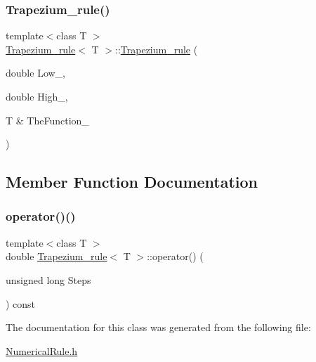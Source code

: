 \subsubsection{\texorpdfstring{Trapezium\+\_\+rule()}{Trapezium\_rule()}}
{\footnotesize\ttfamily template$<$class T $>$ \\
\hyperlink{classTrapezium__rule}{Trapezium\+\_\+rule}$<$ T $>$\+::\hyperlink{classTrapezium__rule}{Trapezium\+\_\+rule} (\begin{DoxyParamCaption}\item[{double}]{Low\+\_\+,  }\item[{double}]{High\+\_\+,  }\item[{T \&}]{The\+Function\+\_\+ }\end{DoxyParamCaption})\hspace{0.3cm}{\ttfamily [inline]}}



\subsection{Member Function Documentation}
\hypertarget{classTrapezium__rule_a6f80a232d2a8fcb21d01b4ac2ec99f12}{}\label{classTrapezium__rule_a6f80a232d2a8fcb21d01b4ac2ec99f12} 
\subsubsection{\texorpdfstring{operator()()}{operator()()}}
{\footnotesize\ttfamily template$<$class T $>$ \\
double \hyperlink{classTrapezium__rule}{Trapezium\+\_\+rule}$<$ T $>$\+::operator() (\begin{DoxyParamCaption}\item[{unsigned long}]{Steps }\end{DoxyParamCaption}) const\hspace{0.3cm}{\ttfamily [inline]}}



The documentation for this class was generated from the following file\+:\begin{DoxyCompactItemize}
\item 
\hyperlink{NumericalRule_8h}{Numerical\+Rule.\+h}\end{DoxyCompactItemize}
